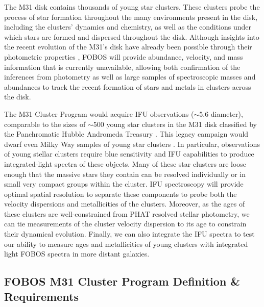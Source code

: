 \documentclass[11pt,a4paper,twoside,onecolumn,openany,final,oldfontcommands]{memoir}
\begin{document}
The M31 disk contains thousands of young star clusters.  These clusters probe the process of star formation throughout the many environments present in the disk, including the clusters' dynamics and chemistry, as well as the conditions under which stars are formed and dispersed throughout the disk.  Although insights into the recent evolution of the M31's disk have already been possible through their photometric properties \citep[e.g.,][]{johnson16}, FOBOS will provide abundance, velocity, and mass information that is currently unavailable, allowing both confirmation of the inferences from photometry as well as large samples of spectroscopic masses and abundances to track the recent formation of stars and metals in clusters across the disk. 

The M31 Cluster Program would acquire IFU observations ($\sim$5.6\arcsec{} diameter), comparable to the sizes of $\sim$500 young star clusters in the M31 disk classified by the Panchromatic Hubble Andromeda Treasury \citep[PHAT;][]{johnson15}.  This legacy campaign would dwarf even Milky Way samples of young star clusters \citep{johnson15}.  In particular, observations of young stellar clusters require blue sensitivity and IFU capabilities to produce integrated-light spectra of these objects. Many of these star clusters are loose enough that the massive stars they contain can be resolved individually or in small very compact groups within the cluster.  IFU spectroscopy will provide optimal spatial resolution to separate these components to probe both the velocity dispersions and metallicities of the clusters.  Moreover, as the ages of these clusters are well-constrained from PHAT resolved stellar photometry, we can tie measurements of the cluster velocity dispersion to its age to constrain their dynamical evolution.  Finally, we can also integrate the IFU spectra to test our ability to measure ages and metallicities of young clusters with integrated light FOBOS spectra in more distant galaxies.



\subsection{FOBOS M31 Cluster Program Definition \& Requirements}
\end{document}
